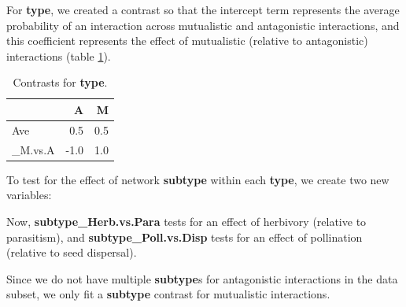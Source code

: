 \documentclass[11pt,]{article}
\newenvironment{Shaded}{}{}
\newcommand{\KeywordTok}[1]{\textcolor[rgb]{0.00,0.00,1.00}{#1}}
\newcommand{\DataTypeTok}[1]{#1}
\newcommand{\DecValTok}[1]{#1}
\newcommand{\StringTok}[1]{\textcolor[rgb]{0.00,0.50,0.50}{#1}}
\newcommand{\OperatorTok}[1]{#1}
\newcommand{\NormalTok}[1]{#1}
\begin{document}
For \textbf{type}, we created a contrast so that the intercept term
represents the average probability of an interaction across mutualistic
and antagonistic interactions, and this coefficient represents the
effect of mutualistic (relative to antagonistic) interactions (table
\ref{tab:type-contrasts}).

\begin{table}[!h]

\caption{\label{tab:type-contrasts}Contrasts for \textbf{type}.}
\centering
\begin{tabular}{lrr}
\toprule
  & A & M\\
\midrule
Ave & 0.5 & 0.5\\
\_M.vs.A & -1.0 & 1.0\\
\bottomrule
\end{tabular}
\end{table}

To test for the effect of network \textbf{subtype} within each
\textbf{type}, we create two new variables:

\begin{Shaded}
\end{Shaded}

Now, \textbf{subtype\_Herb.vs.Para} tests for an effect of herbivory
(relative to parasitism), and \textbf{subtype\_Poll.vs.Disp} tests for
an effect of pollination (relative to seed dispersal).

Since we do not have multiple \textbf{subtype}s for antagonistic
interactions in the data subset, we only fit a \textbf{subtype} contrast
for mutualistic interactions.
\end{document}
